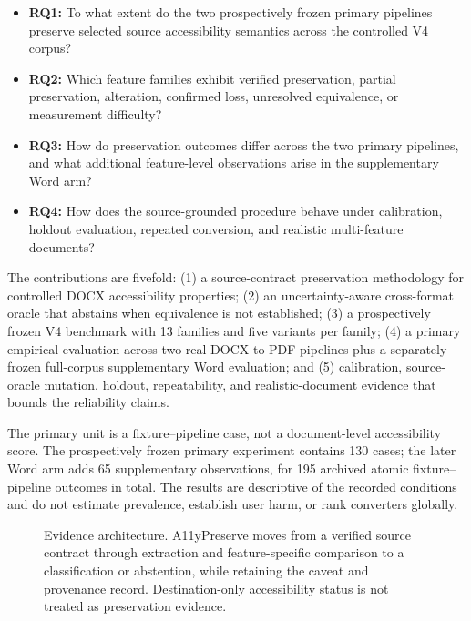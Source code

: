 \begin{itemize}
\item \textbf{RQ1:} To what extent do the two prospectively frozen primary pipelines preserve selected source accessibility semantics across the controlled V4 corpus?
\item \textbf{RQ2:} Which feature families exhibit verified preservation, partial preservation, alteration, confirmed loss, unresolved equivalence, or measurement difficulty?
\item \textbf{RQ3:} How do preservation outcomes differ across the two primary pipelines, and what additional feature-level observations arise in the supplementary Word arm?
\item \textbf{RQ4:} How does the source-grounded procedure behave under calibration, holdout evaluation, repeated conversion, and realistic multi-feature documents?
\end{itemize}

The contributions are fivefold: (1) a source-contract preservation methodology for controlled DOCX accessibility properties; (2) an uncertainty-aware cross-format oracle that abstains when equivalence is not established; (3) a prospectively frozen V4 benchmark with 13 families and five variants per family; (4) a primary empirical evaluation across two real DOCX-to-PDF pipelines plus a separately frozen full-corpus supplementary Word evaluation; and (5) calibration, source-oracle mutation, holdout, repeatability, and realistic-document evidence that bounds the reliability claims.

The primary unit is a fixture--pipeline case, not a document-level accessibility score. The prospectively frozen primary experiment contains 130 cases; the later Word arm adds 65 supplementary observations, for 195 archived atomic fixture--pipeline outcomes in total. The results are descriptive of the recorded conditions and do not estimate prevalence, establish user harm, or rank converters globally.

\begin{figure}[t]
\centering
{}
\caption{Evidence architecture. A11yPreserve moves from a verified source contract through extraction and feature-specific comparison to a classification or abstention, while retaining the caveat and provenance record. Destination-only accessibility status is not treated as preservation evidence.}
\label{fig:workflow}
\end{figure}
